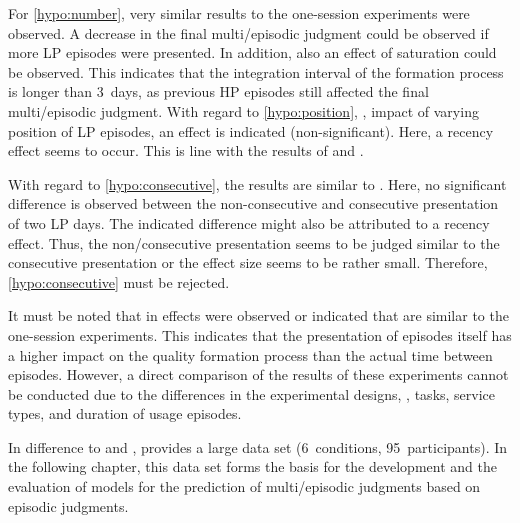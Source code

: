 For \autoref{hypo:number}, very similar results to the one-session experiments were observed.
A decrease in the final multi\-/episodic judgment could be observed if more \ac{LP} episodes were presented.
In addition, also an effect of saturation could be observed.
This indicates that the integration interval of the formation process is longer than 3~days, as previous \ac{HP} episodes still affected the final multi\-/episodic judgment.
With regard to \autoref{hypo:position}, \ie, impact of varying position of \ac{LP} episodes, an effect is indicated (non-significant).
Here, a recency effect seems to occur.
This is line with the results of  and \EIIa{}.

With regard to \autoref{hypo:consecutive}, the results are similar to \EIIa{}.
Here, no significant difference is observed between the non-consecutive and consecutive presentation of two \ac{LP} days.
The indicated difference might also be attributed to a recency effect.
Thus, the non\-/consecutive presentation seems to be judged similar to the consecutive presentation or the effect size seems to be rather small.
Therefore, \autoref{hypo:consecutive} must be rejected.

It must be noted that in  effects were observed or indicated that are similar to the one-session experiments.
This indicates that the presentation of episodes itself has a higher impact on the quality formation process than the actual time between episodes.
However, a direct comparison of the results of these experiments cannot be conducted due to the differences in the experimental designs, \ie, tasks, service types, and duration of usage episodes.

In difference to  and ,  provides a large data set (6~conditions, 95~participants).
In the following chapter, this data set forms the basis for the development and the evaluation of models for the prediction of multi\-/episodic judgments based on episodic judgments.


